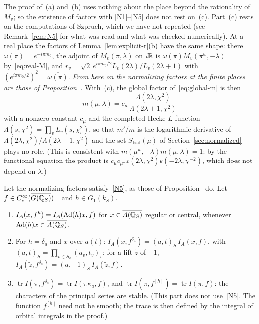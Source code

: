The proof of~(a) and~(b) uses nothing about the place beyond the
rationality of $M_v$; so the existence of factors with
\ref{N1}--\ref{N5} does not rest on~(c). Part~(c) rests on the
computations of Szpruch, which we have not repeated (see
Remark~\ref{rem:N5} for what was read and what was checked numerically).
At a real place the factors of Lemma~\ref{lem:explicit-r}(b) have the
same shape: there $\omega(\pi)=e^{-i\pi m_0}$, the adjoint of
$M_v(\pi,\lambda)$ on $i\mathbb{R}$ is $\omega(\pi)M_v(\pi^w,-\lambda)$
by~\eqref{eq:real-M}, and $r_v=\sqrt2\,e^{i\pi m_0/2}L_v(2\lambda)/
L_v(2\lambda+1)$ with $(e^{i\pi m_0/2})^2=\overline{\omega(\pi)}$.
\emph{From here on the normalizing factors at the finite places are those
of Proposition~\normref{}.} With~(c), the global factor
of~\eqref{eq:global-m} is then
\[
m(\mu,\lambda)=c_\mu\,\frac{\Lambda(2\lambda,\chi^2)}{\Lambda(2\lambda+1,
\chi^2)}
\]
with a nonzero constant $c_\mu$ and the completed Hecke $L$-function
$\Lambda(s,\chi^2)=\prod_vL_v(s,\chi_v^2)$, so that $m'/m$ is the
logarithmic derivative of $\Lambda(2\lambda,\chi^2)/\Lambda(2\lambda+1,
\chi^2)$ and the set $S_{\mathrm{bad}}(\mu)$ of
Section~\ref{sec:normalized} plays no role. (This is consistent with
$m(\mu^w,-\lambda)m(\mu,\lambda)=1$: by the functional equation the
product is $c_\mu c_{\mu^w}\varepsilon(2\lambda,\chi^2)\varepsilon(-2
\lambda,\chi^{-2})$, which does not depend on $\lambda$.)

\begin{proposition}\label{prop:IA-gl2}
Let the normalizing factors satisfy~\ref{N5}, as those of
Proposition~\normref{} do. Let $f\in C_c^\infty(\overline{G(\mathbb{Q}_S)})_-$ and $h\in
G_1(k_S)$.
\begin{enumerate}[label=(\alph*)]
\item $I_A(x,f^h)=I_A(\operatorname{Ad}(h)x,f)$ for $x\in\overline{A(\mathbb{Q}_S)}$ regular or
  central, whenever $\operatorname{Ad}(h)x\in\overline{A(\mathbb{Q}_S)}$.
\item For $h=\delta_a$ and $x$ over $a(t)$:
  $I_A(x,f^{\delta_a})=(a,t)_S\,I_A(x,f)$, with $(a,t)_S=\prod_{v\in S_k}
  (a_v,t_v)_v$; for a lift $\tilde z$ of $-1$,
  $I_A(\tilde z,f^{\delta_a})=(a,-1)_S\,I_A(\tilde z,f)$.
\item $\operatorname{tr}I(\pi,f^{\delta_a})=\operatorname{tr}I(\pi\kappa_a,
  f)$, and $\operatorname{tr}I(\pi,f^{[h]})=\operatorname{tr}I(\pi,f)$:
  the characters of the principal series are stable. (This part does not
  use~\ref{N5}. The function $f^{[h]}$ need not be smooth; the trace is
  then defined by the integral of orbital integrals in the proof.)
\end{enumerate}
\end{proposition}


